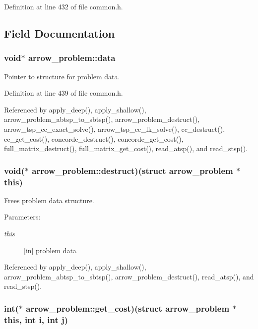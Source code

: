 Definition at line 432 of file common.h.

\subsection{Field Documentation}
\hypertarget{structarrow__problem_6dbeb0f93e110adf45096c7457cd588d}{
\subsubsection[{data}]{\setlength{\rightskip}{0pt plus 5cm}void$\ast$ {\bf arrow\_\-problem::data}}}
\label{structarrow__problem_6dbeb0f93e110adf45096c7457cd588d}


Pointer to structure for problem data. 

Definition at line 439 of file common.h.

Referenced by apply\_\-deep(), apply\_\-shallow(), arrow\_\-problem\_\-abtsp\_\-to\_\-sbtsp(), arrow\_\-problem\_\-destruct(), arrow\_\-tsp\_\-cc\_\-exact\_\-solve(), arrow\_\-tsp\_\-cc\_\-lk\_\-solve(), cc\_\-destruct(), cc\_\-get\_\-cost(), concorde\_\-destruct(), concorde\_\-get\_\-cost(), full\_\-matrix\_\-destruct(), full\_\-matrix\_\-get\_\-cost(), read\_\-atsp(), and read\_\-stsp().\hypertarget{structarrow__problem_ff7c7873a7e7130a16e2a49da20ee625}{
\subsubsection[{destruct}]{\setlength{\rightskip}{0pt plus 5cm}void($\ast$ {\bf arrow\_\-problem::destruct})(struct {\bf arrow\_\-problem} $\ast$this)}}
\label{structarrow__problem_ff7c7873a7e7130a16e2a49da20ee625}


Frees problem data structure. 

\begin{Desc}
\item[Parameters:]
\begin{description}
\item[{\em this}]\mbox{[}in\mbox{]} problem data \end{description}
\end{Desc}


Referenced by apply\_\-deep(), apply\_\-shallow(), arrow\_\-problem\_\-abtsp\_\-to\_\-sbtsp(), arrow\_\-problem\_\-destruct(), read\_\-atsp(), and read\_\-stsp().\hypertarget{structarrow__problem_4f1f4c9ef90f240b248e8f39360da769}{
\subsubsection[{get\_\-cost}]{\setlength{\rightskip}{0pt plus 5cm}int($\ast$ {\bf arrow\_\-problem::get\_\-cost})(struct {\bf arrow\_\-problem} $\ast$this, int i, int j)}}
\label{structarrow__problem_4f1f4c9ef90f240b248e8f39360da769}


